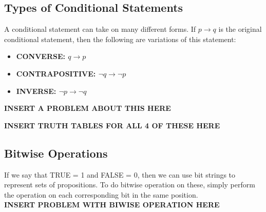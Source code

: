 \subsection{Types of Conditional Statements}

A conditional statement can take on many different forms. If $p \rightarrow q$ is the original conditional statement, then the following are variations of this statement:

\begin{itemize}
    \item \bf{CONVERSE:} $q \rightarrow p$
    \item \bf{CONTRAPOSITIVE:} $\neg q \rightarrow \neg p$
    \item \bf{INVERSE:} $\neg p \rightarrow \neg q$
\end{itemize}

\bf{INSERT A PROBLEM ABOUT THIS HERE}

\bf{INSERT TRUTH TABLES FOR ALL 4 OF THESE HERE}


\subsection{Bitwise Operations}

If we say that TRUE = 1 and FALSE = 0, then we can use bit strings to represent sets of propositions. To do bitwise operation on these, simply perform the operation on each corresponding bit in the same position.\\

\bf{INSERT PROBLEM WITH BIWISE OPERATION HERE}